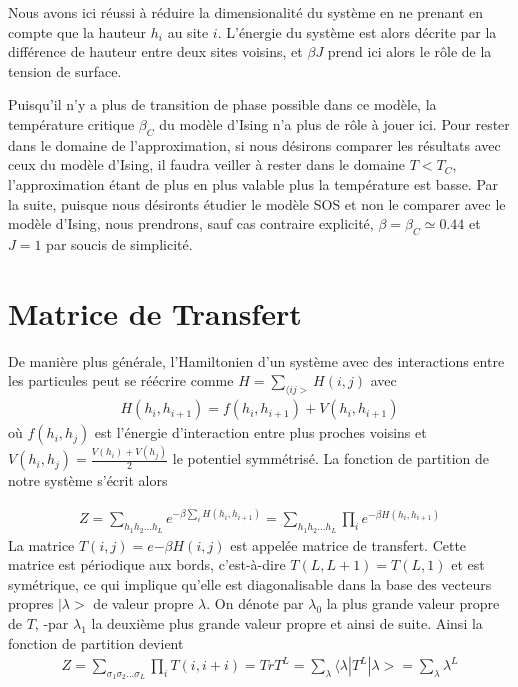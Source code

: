 Nous avons ici réussi à réduire la dimensionalité du système en ne prenant en compte que la hauteur $h_i$ au site $i$. L'énergie du système est alors décrite par la différence de hauteur entre deux sites voisins, et $\beta J$ prend ici alors le rôle de la tension de surface.

Puisqu'il n'y a plus de transition de phase possible dans ce modèle, la température critique $\beta_C$ du modèle d'Ising n'a plus de rôle à jouer ici. Pour rester dans le domaine de l'approximation, si nous désirons comparer les résultats avec ceux du modèle d'Ising, il faudra veiller à rester dans le domaine $T \less T_C$, l'approximation étant de plus en plus valable plus la température est basse. Par la suite, puisque nous désironts étudier le modèle SOS et non le comparer avec le modèle d'Ising, nous prendrons, sauf cas contraire explicité, $\beta = \beta_C \simeq 0.44$ et $J=1$ par soucis de simplicité. 

  \section{Matrice de Transfert}

	De manière plus générale, l'Hamiltonien d'un système avec des interactions entre les particules peut se réécrire comme $H = \sum_{\langle ij >} H(i,j)$ avec
\begin{align*}
  H(h_i,h_{i+1}) = f(h_i,h_{i+1}) + V(h_i,h_{i+1}) 
\end{align*}
où $f(h_i,h_j)$ est l'énergie d'interaction entre plus proches voisins et $V(h_i,h_j)=\frac{V(h_i)+V(h_j)}{2}$ le potentiel symmétrisé.
La fonction de partition de notre système s'écrit alors 

\begin{align*}
 Z = \sum_{h_1 h_2 ... h_L} e^{- \beta \sum_{i} H(h_i,h_{i+1})}  
   = \sum_{h_1 h_2 ... h_L} \prod_{i} e^{-\beta H(h_i,h_{i+1})} 
\end{align*}
La matrice $T(i,j) = e{-\beta H(i,j)}$ est appelée matrice de transfert. Cette matrice est périodique aux bords, c'est-à-dire $T(L,L+1) = T(L,1)$ et est symétrique, ce qui implique qu'elle est diagonalisable dans la base des vecteurs propres $|\lambda >$ de valeur propre $\lambda$. On dénote par $\lambda_0$ la plus grande valeur propre de $T$, -par $\lambda_1$ la deuxième plus grande valeur propre et ainsi de suite.
Ainsi la fonction de partition devient\cite{}
\begin{align}
  Z = \sum_{\sigma_1 \sigma_2 ... \sigma_{L}} \prod_{i} T(i,i+i) = Tr T^L  = \sum_\lambda \langle\lambda | T^L | \lambda> = \sum_\lambda \lambda^L
\end{align}


